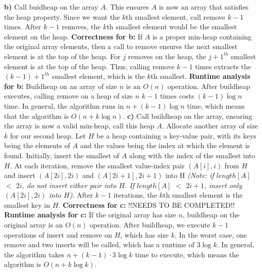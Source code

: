 \documentclass[11pt]{article}
\begin{document}
\begin{flushleft}
		\newline
		\newline
		\textbf{b)} Call buidheap on the array $A$. This ensures $A$ is now an array that satisfies the heap property. Since we want the $k$th smallest element, call remove $k - 1$ times. After $k - 1$ removes, the $k$th smallest element would be the smallest element on the heap. 
		\newline
		\textbf{Correctness for b:} If $A$ is a proper min-heap containing the original array elements, then a call to remove ensures the next smallest element is at the top of the heap. For $j$ removes on the heap, the $j + 1^{th}$ smallest element is at the top of the heap. Thus, calling remove $k - 1$ times extracts the $(k - 1) + 1^{th}$ smallest element, which is the $k$th smallest. 
		\newline
		\textbf{Runtime analysis for b:} Buildheap on an array of size $n$ is an $O(n)$ 	operation. After buildheap executes, calling remove on a heap of size $n$ $k - 1$ times costs $(k - 1) \log n$ time. In general, the algorithm runs in
		$n + (k - 1) \log n$ time, which means that the algorithm is $O(n + k \log n)$.
		\newpage
		\textbf{c)} Call buildheap on the array, ensuring the array is now a valid min-heap, call this heap $A$. Allocate another array of size $k$ for our second heap. Let $H$ be a heap containing a key-value pair, with its keys being the elements of $A$ and the values being the index at which the element is found. Initially, insert the smallest of $A$ along with the index of the smallest into $H$. At each iteration, remove the smallest value-index pair $(A[i], i)$ from $H$ and insert $(A[2i], 2i)$ and $(A[2i + 1], 2i + 1)$ into H \emph{(Note: if $length[A]$ $<$ $2i$, do not insert either pair into $H$. If $length[A]$ $<$ $2i + 1$, insert only $(A[2i], 2i)$ into $H$)}. After $k - 1$ iterations, the $k$th smallest element is the smallest key in $H$. 
		\newline
		\textbf{Correctness for c:} !!NEEDS TO BE COMPLETED!!
		\newline
		\textbf{Runtime analysis for c:} If the original array has size $n$, buildheap on the original array is an $O(n)$ operation. After buildheap, we execute $k - 1$ operations of insert and remove on $H$, which has size $k$. In the worst case, one remove and two inserts will be called, which has a runtime of $3 \log k$. In general, the algorithm takes $n + (k - 1) \cdot 3 \log k$ time to execute, which means the algorithm is $O(n + k \log k)$.
		\newline

\end{flushleft}
\end{document}
